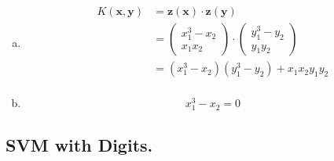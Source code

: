 \documentclass{article}
\renewcommand{\vec}[1]{\mathbf{#1}}
\begin{document}
\begin{enumerate}[(a)]
  \item \textit{}

    \begin{align*}
      K(\vec{x}, \vec{y}) &= \vec{z}(\vec{x})\cdot\vec{z}(\vec{y}) \\
      &= \begin{pmatrix} x_1^3 - x_2 \\ x_1x_2 \end{pmatrix} \cdot
        \begin{pmatrix} y_1^3 - y_2 \\ y_1y_2 \end{pmatrix} \\
      &= (x_1^3 - x_2)(y_1^3 - y_2) + x_1x_2y_1y_2 \\
    \end{align*}

  \item \textit{}

    $$x_1^3 - x_2 = 0$$

\end{enumerate}


\subsection*{SVM with Digits.}
\end{document}
